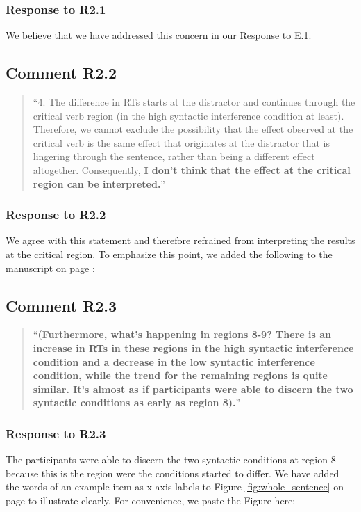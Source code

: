 \documentclass[12pt]{article}
\begin{document}
\subsubsection*{Response to R2.1}
We believe that we have addressed this concern in our Response to E.1.

\subsection*{Comment R2.2}
\begin{quote}
``4. The difference in RTs starts at the distractor and continues through the critical verb region (in the high syntactic interference condition at least). Therefore, we cannot exclude the possibility that the effect observed at the critical verb is the same effect that originates at the distractor that is lingering through the sentence, rather than being a different effect altogether. Consequently, \textbf{I don't think that the effect at the critical region can be interpreted.}''
\end{quote}

\subsubsection*{Response to R2.2}
We agree with this statement and therefore refrained from interpreting the results at the critical region. To emphasize this point, we added the following to the manuscript on page \pageref{only_precritical}:\\


\subsection*{Comment R2.3}
\begin{quote}
``\textbf{(Furthermore, what's happening in regions 8-9? There is an increase in RTs in these regions in the high syntactic interference condition and a decrease in the low syntactic interference condition, while the trend for the remaining regions is quite similar. It's almost as if participants were able to discern the two syntactic conditions as early as region 8).}''
\end{quote}

\subsubsection*{Response to R2.3}
The participants were able to discern the two syntactic conditions at region 8 because this is the region were the conditions started to differ. We have added the words of an example item as x-axis labels to Figure \ref{fig:whole_sentence} on page \pageref{fig:whole_sentence} to illustrate clearly. For convenience, we paste the Figure here:
\newpage
{}
\end{document}
